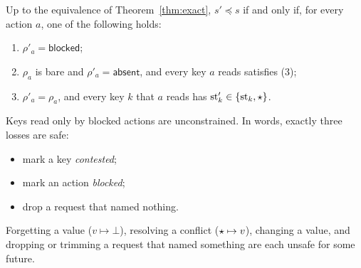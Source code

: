 \begin{theorem}\label{thm:safe}\label{thm:tombstone}
Up to the equivalence of Theorem~\ref{thm:exact}, $s' \preceq s$ if and only if, for every action
$a$, one of the following holds:
\begin{enumerate}
\item[(1)] $\rho'_a = \mathsf{blocked}$;
\item[(2)] $\rho_a$ is bare and $\rho'_a = \mathsf{absent}$, and every key $a$ reads satisfies (3);
\item[(3)] $\rho'_a = \rho_a$, and every key $k$ that $a$ reads has $\mathrm{st}'_k \in \{\mathrm{st}_k, \star\}$.
\end{enumerate}
Keys read only by blocked actions are unconstrained. In words, exactly three losses are safe:
\begin{itemize}
\item mark a key \emph{contested};
\item mark an action \emph{blocked};
\item drop a request that named nothing.
\end{itemize}
Forgetting a value ($v \mapsto \bot$), resolving a conflict ($\star \mapsto v$), changing a
value, and dropping or trimming a request that named something are each unsafe for some future.
\end{theorem}
